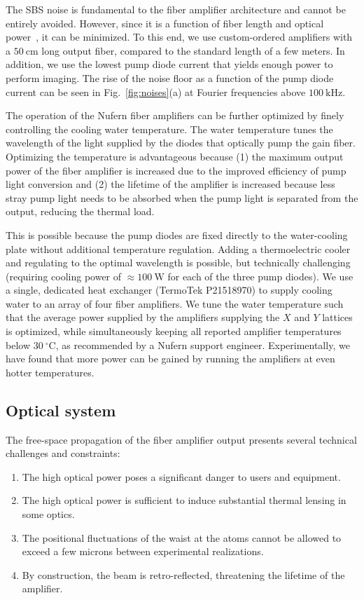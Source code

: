 \documentclass[twocolumn,aps,pra,showpacs,preprintnumbers,bibnotes]{revtex4-1}
\newcommand\unit[2]{\ensuremath{#1~\mathrm{{#2}}}}
\begin{document}
The SBS noise is fundamental to the fiber amplifier architecture and cannot be entirely avoided. However, since it is a function of fiber length and optical power~\cite{Agrawal2013}, it can be minimized. To this end, we use custom-ordered amplifiers with a \unit{50}{cm} long output fiber, compared to the standard length of a few meters.
In addition, we use the lowest pump diode current that yields enough power to perform imaging.
The rise of the noise floor as a function of the pump diode current can be seen in Fig.~\ref{fig:noises}(a) at Fourier frequencies above \unit{100}{kHz}.

The operation of the Nufern fiber amplifiers can be further optimized by finely controlling the cooling water temperature.
The water temperature tunes the wavelength of the light supplied by the diodes that optically pump the gain fiber.
Optimizing the temperature is advantageous because (1) the maximum output power of the fiber amplifier is increased due to the improved efficiency of pump light conversion and (2) the lifetime of the amplifier is increased because less stray pump light needs to be absorbed when the pump light is separated from the output, reducing the thermal load.

This is possible because the pump diodes are fixed directly to the water-cooling plate without additional temperature regulation.
Adding a thermoelectric cooler and regulating to the optimal wavelength is possible, but technically challenging (requiring cooling power of $\approx$\unit{100}{W} for each of the three pump diodes).
We use a single, dedicated heat exchanger (TermoTek P21518970) to supply cooling water to an array of four fiber amplifiers.
We tune the water temperature such that the average power supplied by the amplifiers supplying the $X$ and $Y$ lattices is optimized, while simultaneously keeping all reported amplifier temperatures below \unit{30}{^\circ{}C}, as recommended by a Nufern support engineer.
Experimentally, we have found that more power can be gained by running the amplifiers at even hotter temperatures.

\subsection{Optical system}
The free-space propagation of the fiber amplifier output presents several technical challenges and constraints:
\begin{enumerate}
  \item The high optical power poses a significant danger to users and equipment.
  \item The high optical power is sufficient to induce substantial thermal lensing in some optics.
  \item The positional fluctuations of the waist at the atoms cannot be allowed to exceed a few microns between experimental realizations.
  \item By construction, the beam is retro-reflected, threatening the lifetime of the amplifier.
  \end{enumerate}
\end{document}
